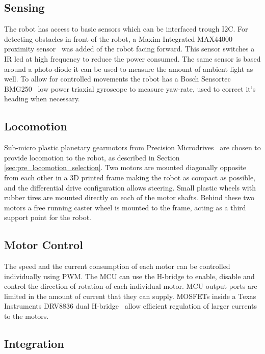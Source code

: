 \subsection{Sensing}
\label{sec:dai_sensing}

The robot has access to basic sensors which can be interfaced trough I2C.
For detecting obstacles in front of the robot, a Maxim Integrated MAX44000 proximity sensor~\cite{max44000_2017} was added of the robot facing forward.
This sensor switches a IR led at high frequency to reduce the power consumed.
The same sensor is based around a photo-diode it can be used to measure the amount of ambient light as well.
To allow for controlled movements the robot has a Bosch Sensortec BMG250~\cite{bosch_bmg250_2017} low power triaxial gyroscope to measure yaw-rate, used to correct it's heading when necessary.

\subsection{Locomotion}

Sub-micro plastic planetary gearmotors from Precision Microdrives~\cite{gearmotor_206-110_2017} are chosen to provide locomotion to the robot, as described in Section \ref{sec:pre_locomotion_selection}.
Two motors are mounted diagonally opposite from each other in a 3D printed frame making the robot as compact as possible, and the differential drive configuration allows steering.
Small plastic wheels with rubber tires are mounted directly on each of the motor shafts.
Behind these two motors a free running caster wheel is mounted to the frame, acting as a third support point for the robot.

\subsection{Motor Control}
\label{sec:dai_motor_control}

The speed and the current consumption of each motor can be controlled individually using PWM.
The MCU can use the H-bridge to enable, disable and control the direction of rotation of each individual motor.
MCU output ports are limited in the amount of current that they can supply.
MOSFETs inside a Texas Instruments DRV8836 dual H-bridge~\cite{drv8836_2017} allow efficient regulation of larger currents to the motors.

\subsection{Integration}

